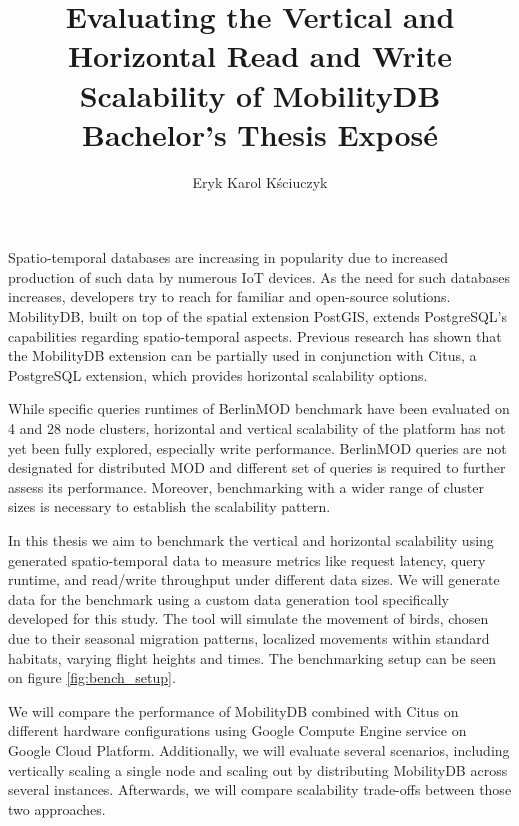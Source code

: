 \documentclass{article}
\title{
	Evaluating the Vertical and Horizontal Read and Write Scalability of 
	MobilityDB
	\\[1ex] \large Bachelor's Thesis Exposé}
\author{Eryk Karol Kściuczyk}
\date{} %
\begin{document}
\maketitle

Spatio-temporal databases are increasing in popularity due to increased
production of such data by numerous IoT devices.
As the need for such databases increases, developers try to reach for 
familiar and open-source solutions.
MobilityDB, built on top of the spatial extension PostGIS, extends PostgreSQL's 
capabilities regarding spatio-temporal aspects.
Previous research has shown that the MobilityDB extension can be partially used
in conjunction with Citus, a PostgreSQL extension, which provides horizontal
scalability options.

While specific queries runtimes of BerlinMOD benchmark have been 
evaluated on 4 and 28 node clusters,
horizontal and vertical scalability of the platform has not yet been fully
explored, especially write performance.
BerlinMOD queries are not designated for distributed MOD and different set of
queries is required to further assess its performance.
Moreover, benchmarking with a wider range of cluster sizes is necessary to 
establish the scalability pattern.

In this thesis we aim to benchmark the vertical and horizontal scalability
using generated spatio-temporal data to measure metrics like request 
latency, query runtime, and read/write throughput under different data sizes.
We will generate data for the benchmark using a custom data generation tool
specifically developed for this study.
The tool will simulate the movement of birds, chosen due to their
seasonal migration patterns, localized movements within standard habitats,
varying flight heights and times. The benchmarking setup can be seen on figure
\ref{fig:bench_setup}.

We will compare the performance of MobilityDB combined with Citus on different
hardware configurations using Google Compute Engine service on Google Cloud
Platform.
Additionally, we will evaluate several scenarios, including vertically scaling 
a single node and scaling out by distributing MobilityDB across several
instances. 
Afterwards, we will compare scalability trade-offs between those two
approaches.
\end{document}
